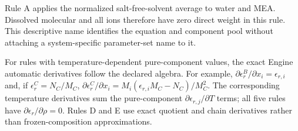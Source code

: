 \documentclass[10pt,oneside]{scrartcl}
\begin{document}
Rule A applies the normalized salt-free-solvent average to water and MEA.
Dissolved molecular  and all ions therefore have zero direct weight
in this rule. This descriptive name identifies the equation and component
pool without attaching a system-specific parameter-set name to it.

For rules with temperature-dependent pure-component values, the exact Engine
automatic derivatives follow the declared algebra. For example,
$\partial\epsilon_r^B/\partial x_i=\epsilon_{r,i}$ and, if
$\epsilon_r^C=N_C/M_C$,
$\partial\epsilon_r^C/\partial x_i=M_i(\epsilon_{r,i}M_C-N_C)/M_C^2$.
The corresponding temperature derivatives sum the pure-component
$\partial\epsilon_{r,j}/\partial T$ terms; all five rules have
$\partial\epsilon_r/\partial\rho=0$. Rules D and E use exact quotient and
chain derivatives rather than frozen-composition approximations.
\end{document}
